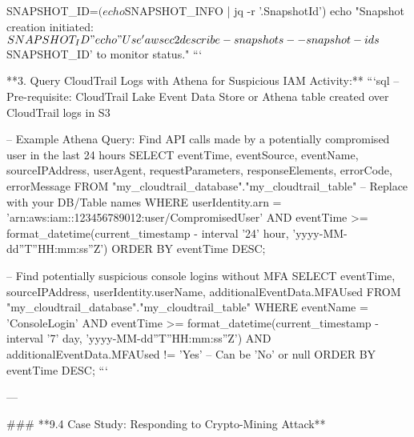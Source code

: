 \documentclass{article}
\begin{document}
SNAPSHOT_ID=$(echo $SNAPSHOT_INFO | jq -r '.SnapshotId')
echo "Snapshot creation initiated: $SNAPSHOT_ID"
echo "Use 'aws ec2 describe-snapshots --snapshot-ids $SNAPSHOT_ID' to monitor status."
```

**3. Query CloudTrail Logs with Athena for Suspicious IAM Activity:**
```sql
-- Pre-requisite: CloudTrail Lake Event Data Store or Athena table created over CloudTrail logs in S3

-- Example Athena Query: Find API calls made by a potentially compromised user in the last 24 hours
SELECT
    eventTime,
    eventSource,
    eventName,
    sourceIPAddress,
    userAgent,
    requestParameters,
    responseElements,
    errorCode,
    errorMessage
FROM
    "my_cloudtrail_database"."my_cloudtrail_table" -- Replace with your DB/Table names
WHERE
    userIdentity.arn = 'arn:aws:iam::123456789012:user/CompromisedUser'
    AND eventTime >= format_datetime(current_timestamp - interval '24' hour, 'yyyy-MM-dd''T''HH:mm:ss''Z')
ORDER BY
    eventTime DESC;

-- Find potentially suspicious console logins without MFA
SELECT
    eventTime,
    sourceIPAddress,
    userIdentity.userName,
    additionalEventData.MFAUsed
FROM
    "my_cloudtrail_database"."my_cloudtrail_table"
WHERE
    eventName = 'ConsoleLogin'
    AND eventTime >= format_datetime(current_timestamp - interval '7' day, 'yyyy-MM-dd''T''HH:mm:ss''Z')
    AND additionalEventData.MFAUsed != 'Yes' -- Can be 'No' or null
ORDER BY
    eventTime DESC;
```

---

### **9.4 Case Study: Responding to Crypto-Mining Attack**
\end{document}
